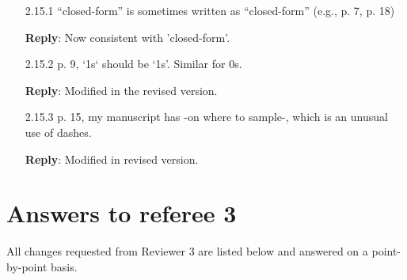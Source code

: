 \documentclass[a4paper]{article}
\newcounter{reviewer}
\def\reply{\textbf{Reply}}
\begin{document}
\begin{answers}
\begin{itemize}[noitemsep,topsep=0pt,parsep=0pt,partopsep=0pt]
\item[2.15.1] “closed-form” is sometimes written as “closed-form” (e.g., p. 7, p. 18)

\reply: Now consistent with 'closed-form'.

\item[2.15.2] p. 9, `1s` should be ‘1s’. Similar for 0s.

\reply: Modified in the revised version.

\item[2.15.3] p. 15, my manuscript has -on where to sample-, which is an unusual use of dashes.

\reply: Modified in revised version.

\end{itemize}

\end{answers}

\section*{Answers to referee 3}
All changes requested from Reviewer 3 are listed below and answered on a point-by-point basis.

\setcounter{reviewer}{3}
\end{document}
